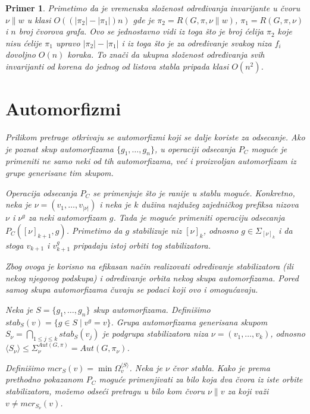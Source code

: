 \documentclass[12pt,oneside]{memoir}
\newtheorem{example}{Primer}
\theoremstyle{definition}
\begin{document}
\begin{example}
  Primetimo da je vremenska složenost određivanja invarijante u čvoru $\nu \|
  w$ u klasi $O((|\pi_2| - |\pi_1|)n)$ gde je $\pi_2 = R(G, \pi, \nu \| w)$,
  $\pi_1 = R(G, \pi, \nu)$ i $n$ broj čvorova grafa. Ovo se jednostavno vidi iz
  toga što je broj ćelija $\pi_2$ koje nisu ćelije $\pi_1$ upravo $|\pi_2| -
  |\pi_1|$ i iz toga što je za određivanje svakog niza $f_i$ dovoljno $O(n)$
  koraka. To znači da ukupna složenost određivanja svih invarijanti od korena
  do jednog od listova stabla pripada klasi $O(n^2)$.

 \section{Automorfizmi}

  Prilikom pretrage otkrivaju se automorfizmi koji se dalje koriste za
  odsecanje. Ako je poznat skup automorfizama $\{g_1, \dots, g_n\}$, u
  operaciji odsecanja $P_C$ moguće je primeniti ne samo neki od tih
  automorfizama, već i proizvoljan automorfizam iz grupe generisane tim skupom.
  
  Operacija odsecanja $P_C$ se primenjuje što je ranije u stablu moguće.
  Konkretno, neka je $\nu = (v_1, \dots, v_{|\nu|})$ i neka je $k$ dužina
  najdužeg zajedničkog prefiksa nizova $\nu$ i $\nu^g$ za neki automorfizam
  $g$. Tada je moguće primeniti operaciju odsecanja $P_C([\nu]_{k+1}, g)$.
  Primetimo da $g$ stabilizuje niz $[\nu]_k$, odnosno $g \in \Sigma_{[\nu]_k}$
  i da stoga $v_{k+1}$ i $v_{k+1}^g$ pripadaju istoj orbiti tog stabilizatora.

  Zbog ovoga je korisno na efikasan način realizovati određivanje stabilizatora
  (ili nekog njegovog podskupa) i određivanje orbita nekog skupa automorfizama.
  Pored samog skupa automorfizama čuvaju se podaci koji ovo i omogućavaju.

  Neka je $S = \{g_1, \dots, g_n\}$ skup automorfizama. Definišimo $stab_S(v) =
  \{g \in S \mid v^{g} = v\}$. Grupa automorfizama generisana skupom $S_\nu =
  \bigcap_{1 \leq j \leq k} stab_S(v_j)$ je podgrupa stabilizatora niza $\nu =
  (v_1, \dots, v_k)$, odnosno $\langle S_\nu \rangle \leq \Sigma^{Aut(G,
  \pi)}_\nu = Aut(G, \pi_\nu)$.

  Definišimo $mcr_S(v) = \min \Omega_v^{\langle S \rangle}$. Neka je $\nu$ čvor stabla.
  Kako je prema prethodno pokazanom $P_C$ moguće primenjivati za bilo koja dva
  čvora iz iste orbite stabilizatora, možemo odseći pretragu u bilo kom čvoru
  $\nu \| v$ za koji važi $v \neq mcr_{S_\nu}(v)$.


\end{example}
\end{document}
